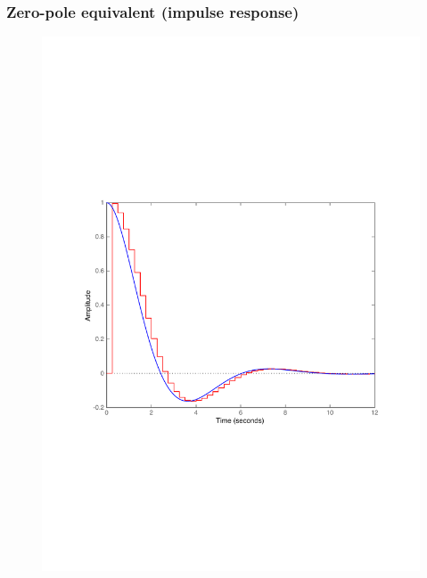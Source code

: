 \begin{frame}
	\frametitle{Zero-pole equivalent (impulse response)}
	\vspace{-0.7em}
	\begin{figure}
		\centering
		\includegraphics[width=0.8\linewidth]{vb4I}
	\end{figure}
\end{frame}

